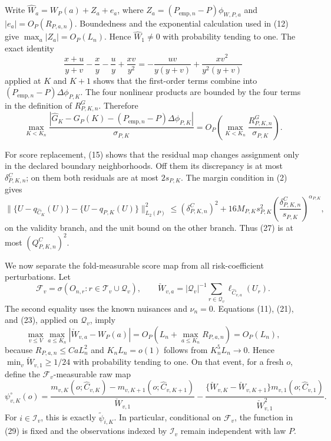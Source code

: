 Write \(\widehat W_a=W_P(a)+Z_a+e_a\), where
\(Z_a=(P_{\mathrm{emp},n}-P)\phi_{W,P,a}\) and
\(|e_a|=O_P(R_{P,a,n})\).  Boundedness and the exponential calculation used in (12) give \(\max_a|Z_a|=O_P(L_n)\).  Hence \(\widehat W_1\neq0\) with probability tending to one.  The exact identity
\[
 \frac{x+u}{y+v}-\frac xy-\frac uy+\frac{xv}{y^2}
 =-\frac{uv}{y(y+v)}+\frac{xv^2}{y^2(y+v)}                                   \tag{25}
\]
applied at \(K\) and \(K+1\) shows that the first-order terms combine into
\((P_{\mathrm{emp},n}-P)\Delta\phi_{P,K}\).  The four nonlinear products are bounded by the four terms in the definition of \(R^G_{P,K,n}\).  Therefore
\[
 \max_{K<K_n}\frac{|\widehat G_K-G_P(K)
 -(P_{\mathrm{emp},n}-P)\Delta\phi_{P,K}|}{\sigma_{P,K}}
 =O_P\!\left(\max_{K<K_n}\frac{R^G_{P,K,n}}{\sigma_{P,K}}\right).              \tag{26}
\]

For score replacement, (15) shows that the residual map changes assignment only in the declared boundary neighborhoods.  Off them its discrepancy is at most \(\delta^C_{P,K,n}\); on them both residuals are at most \(2s_{P,K}\).  The margin condition in (2) gives
\[
 \|\{U-q_{\widehat C_K}(U)\}-\{U-q_{P,K}(U)\}\|_{L_2(P)}^2
 \leq(\delta^C_{P,K,n})^2
 +16M_{P,K}s_{P,K}^2
 \left(\frac{\delta^C_{P,K,n}}{s_{P,K}}\right)^{\alpha_{P,K}},                 \tag{27}
\]
on the validity branch, and the unit bound on the other branch.  Thus (27) is at most \((Q^C_{P,K,n})^2\).

We now separate the fold-measurable score map from all risk-coefficient perturbations.  Let
\[
 \mathcal F_v=\sigma(O_{n,r}:r\in\mathcal T_v\cup\mathcal Q_v),
 \qquad
 \check W_{v,a}=|\mathcal Q_v|^{-1}\sum_{r\in\mathcal Q_v}
 \ell_{\widehat C_{v,a}}(U_r).
\]
The second equality uses the known nuisances and \(\nu_n=0\).  Equations (11), (21), and (23), applied on \(\mathcal Q_v\), imply
\[
 \max_{v\leq V}\max_{a\leq K_n}|\check W_{v,a}-W_P(a)|
 =O_P\!\left(L_n+\max_{a\leq K_n}R_{P,a,n}\right)=O_P(L_n),                    \tag{28}
\]
because \(R_{P,a,n}\leq CaL_n^2\) and \(K_nL_n=o(1)\) follows from \(K_n^5L_n\to0\).  Hence \(\min_v\check W_{v,1}\geq1/24\) with probability tending to one.  On that event, for a fresh \(o\), define the \(\mathcal F_v\)-measurable raw map
\[
 \psi_{v,K}^{\circ}(o)=
 \frac{m_{v,K}(o;\widehat C_{v,K})-m_{v,K+1}(o;\widehat C_{v,K+1})}{\check W_{v,1}}
 -\frac{\{\check W_{v,K}-\check W_{v,K+1}\}m_{v,1}(o;\widehat C_{v,1})}
 {\check W_{v,1}^2}.                                                           \tag{29}
\]
For \(i\in\mathcal I_v\), this is exactly \(\widetilde\psi_{i,K}\).  In particular, conditional on \(\mathcal F_v\), the function in (29) is fixed and the observations indexed by \(\mathcal I_v\) remain independent with law \(P\).

